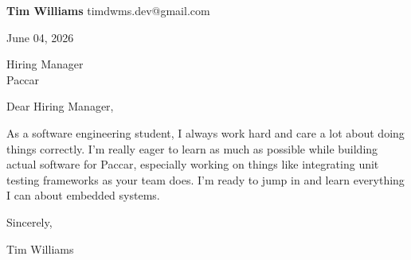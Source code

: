 \documentclass[12pt]{article}
\begin{document}
\textbf{Tim Williams} \hfill timdwms.dev@gmail.com

\vspace{1em}

June 04, 2026

\vspace{1em}

Hiring Manager \\
Paccar

\vspace{1em}

Dear Hiring Manager,

As a software engineering student, I always work hard and care a lot about doing things correctly. I’m really eager to learn as much as possible while building actual software for Paccar, especially working on things like integrating unit testing frameworks as your team does. I’m ready to jump in and learn everything I can about embedded systems.

\vspace{1em}

Sincerely,

\vspace{2em}

Tim Williams
\end{document}
